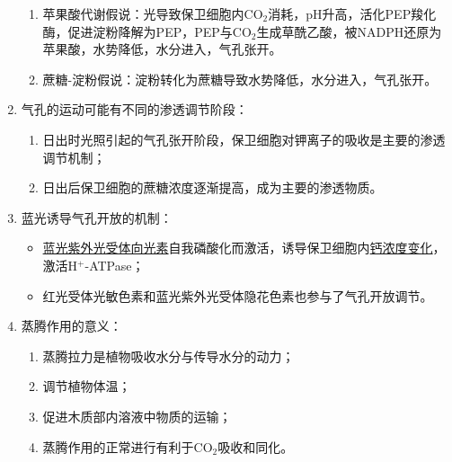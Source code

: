 \begin{enumerate}
\begin{enumerate}
        \item 苹果酸代谢假说：光导致保卫细胞内CO$_2$消耗，pH升高，活化PEP羧化酶，促进淀粉降解为PEP，PEP与CO$_2$生成草酰乙酸，被NADPH还原为苹果酸，水势降低，水分进入，气孔张开。
        \item 蔗糖-淀粉假说：淀粉转化为蔗糖导致水势降低，水分进入，气孔张开。
    \end{enumerate}
    \item 气孔的运动可能有不同的渗透调节阶段：
    \begin{enumerate}
        \item 日出时光照引起的气孔张开阶段，保卫细胞对钾离子的吸收是主要的渗透调节机制；
        \item 日出后保卫细胞的蔗糖浓度逐渐提高，成为主要的渗透物质。
    \end{enumerate}
    \item 蓝光诱导气孔开放的机制：
    \begin{itemize}
        \item \uline{蓝光紫外光受体向光素}自我磷酸化而激活，诱导保卫细胞内\uline{钙浓度变化}，激活H$^+$-ATPase；
        \item 红光受体光敏色素和蓝光紫外光受体隐花色素也参与了气孔开放调节。
    \end{itemize}
    \item 蒸腾作用的意义：
    \begin{enumerate}
        \item 蒸腾拉力是植物吸收水分与传导水分的动力；
        \item 调节植物体温；
        \item 促进木质部内溶液中物质的运输；
        \item 蒸腾作用的正常进行有利于CO$_2$吸收和同化。            
    \end{enumerate}
\end{enumerate}